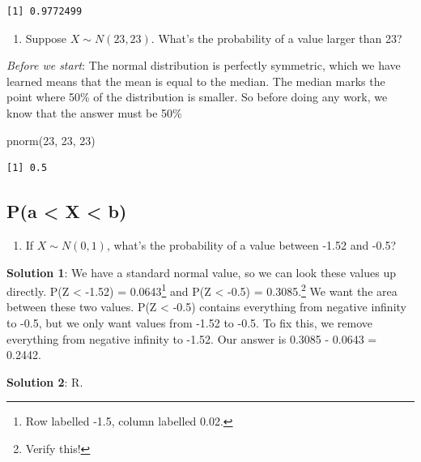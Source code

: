 \documentclass[
  letterpaper,
  DIV=11,
  numbers=noendperiod,
  oneside]{scrreprt}
\newenvironment{Shaded}{\begin{snugshade}}{\end{snugshade}}
\newcommand{\DecValTok}[1]{\textcolor[rgb]{0.68,0.00,0.00}{#1}}
\newcommand{\FunctionTok}[1]{\textcolor[rgb]{0.28,0.35,0.67}{#1}}
\newcommand{\NormalTok}[1]{\textcolor[rgb]{0.00,0.23,0.31}{#1}}
\providecommand{\tightlist}{%
  \setlength{\itemsep}{0pt}\setlength{\parskip}{0pt}}\usepackage{longtable,booktabs,array}
\begin{document}
\begin{verbatim}
[1] 0.9772499
\end{verbatim}

\begin{enumerate}
\def\labelenumi{\arabic{enumi}.}
\setcounter{enumi}{3}
\tightlist
\item
  Suppose \(X\sim N(23, 23)\). What's the probability of a value larger
  than 23?
\end{enumerate}

\emph{Before we start}: The normal distribution is perfectly symmetric,
which we have learned means that the mean is equal to the median. The
median marks the point where 50\% of the distribution is smaller. So
before doing any work, we know that the answer must be 50\%

\begin{Shaded}
\begin{Highlighting}[]
\FunctionTok{pnorm}\NormalTok{(}\DecValTok{23}\NormalTok{, }\DecValTok{23}\NormalTok{, }\DecValTok{23}\NormalTok{)}
\end{Highlighting}
\end{Shaded}

\begin{verbatim}
[1] 0.5
\end{verbatim}

\hypertarget{pa-x-b}{%
\subsection{P(a \textless{} X \textless{} b)}\label{pa-x-b}}

\begin{enumerate}
\def\labelenumi{\arabic{enumi}.}
\setcounter{enumi}{4}
\tightlist
\item
  If \(X\sim N(0, 1)\), what's the probability of a value between -1.52
  and -0.5?
\end{enumerate}

\textbf{Solution 1}: We have a standard normal value, so we can look
these values up directly. P(Z \textless{} -1.52) = 0.0643\footnote{Row
  labelled -1.5, column labelled 0.02.} and P(Z \textless{} -0.5) =
0.3085.\footnote{Verify this!} We want the area between these two
values. P(Z \textless{} -0.5) contains everything from negative infinity
to -0.5, but we only want values from -1.52 to -0.5. To fix this, we
remove everything from negative infinity to -1.52. Our answer is 0.3085
- 0.0643 = 0.2442.

\textbf{Solution 2}: R.
\end{document}
